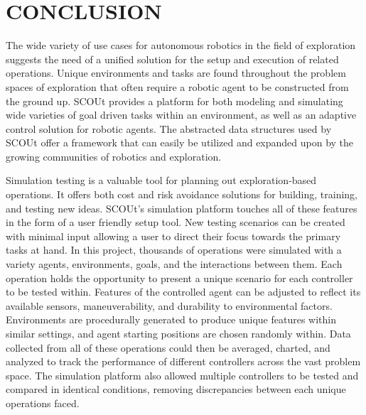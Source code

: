 

\chapter{CONCLUSION} \label{ch:conclusion}

The wide variety of use cases for autonomous robotics in the field of exploration suggests the need of a unified solution for the setup and execution of related operations.
Unique environments and tasks are found throughout the problem spaces of exploration that often require a robotic agent to be constructed from the ground up.
SCOUt provides a platform for both modeling and simulating wide varieties of goal driven tasks within an environment, as well as an adaptive control solution for robotic agents.
The abstracted data structures used by SCOUt offer a framework that can easily be utilized and expanded upon by the growing communities of robotics and exploration.

Simulation testing is a valuable tool for planning out exploration-based operations.
It offers both cost and risk avoidance solutions for building, training, and testing new ideas.
SCOUt's simulation platform touches all of these features in the form of a user friendly setup tool.
New testing scenarios can be created with minimal input allowing a user to direct their focus towards the primary tasks at hand.
In this project, thousands of operations were simulated with a variety agents, environments, goals, and the interactions between them.
Each operation holds the opportunity to present a unique scenario for each controller to be tested within.
Features of the controlled agent can be adjusted to reflect its available sensors, maneuverability, and durability to environmental factors.
Environments are procedurally generated to produce unique features within similar settings, and agent starting positions are chosen randomly within.
Data collected from all of these operations could then be averaged, charted, and analyzed to track the performance of different controllers across the vast problem space.
The simulation platform also allowed multiple controllers to be tested and compared in identical conditions, removing discrepancies between each unique operations faced.

